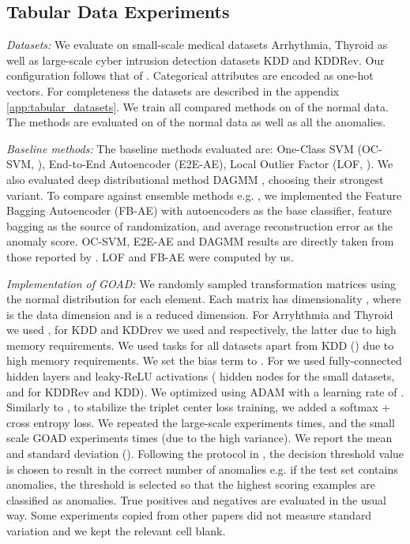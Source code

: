 \documentclass{article} \usepackage{iclr2020_conference,times}
\begin{document}
\subsection{Tabular Data Experiments}
\label{subsec:tabular}

\textit{Datasets:} We evaluate on small-scale medical datasets Arrhythmia, Thyroid as well as large-scale cyber intrusion detection datasets KDD and KDDRev. Our configuration follows that of \cite{zong2018deep}. Categorical attributes are encoded as one-hot vectors. For completeness the datasets are described in the appendix \ref{app:tabular_datasets}. We train all compared methods on  of the normal data. The methods are evaluated on  of the normal data as well as all the anomalies.

\textit{Baseline methods:} The baseline methods evaluated are: One-Class SVM (OC-SVM,  \cite{scholkopf2000support}), End-to-End Autoencoder (E2E-AE), Local Outlier Factor (LOF, \cite{breunig2000lof}). We also evaluated deep distributional method DAGMM \citep{zong2018deep}, choosing their strongest variant. To compare against ensemble methods e.g. \cite{chen2017outlier}, we implemented the Feature Bagging Autoencoder (FB-AE) with autoencoders as the base classifier, feature bagging as the source of randomization, and average reconstruction error as the anomaly score. OC-SVM, E2E-AE and DAGMM results are directly taken from those reported by \cite{zong2018deep}. LOF and FB-AE were computed by us. 

\textit{Implementation of GOAD:} We randomly sampled transformation matrices using the normal distribution for each element. Each matrix has dimensionality , where  is the data dimension and  is a reduced dimension. For Arryhthmia and Thyroid we used , for KDD and KDDrev we used  and  respectively, the latter due to high memory requirements. We used  tasks for all datasets apart from KDD () due to high memory requirements. We set the bias term to . For  we used fully-connected hidden layers and leaky-ReLU activations ( hidden nodes for the small datasets,  and  for KDDRev and KDD). We optimized using ADAM with a learning rate of . Similarly to \cite{he2018triplet}, to stabilize the triplet center loss training, we added a softmax + cross entropy loss. We repeated the large-scale experiments  times, and the small scale GOAD experiments  times (due to the high variance). We report the mean and standard deviation (). Following the protocol in \cite{zong2018deep}, the decision threshold value is chosen to result in the correct number of anomalies e.g. if the test set contains  anomalies, the threshold is selected so that the highest  scoring examples are classified as anomalies. True positives and negatives are evaluated in the usual way. Some experiments copied from other papers did not measure standard variation and we kept the relevant cell blank.
\end{document}
